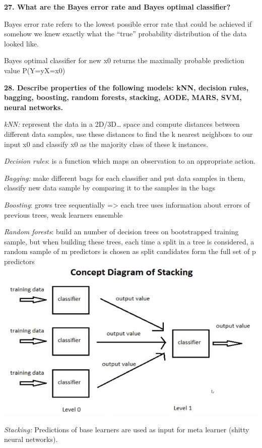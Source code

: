\textbf{27. What are the Bayes error rate and Bayes optimal classifier?}

Bayes error rate refers to the lowest possible error rate that could be
achieved if somehow we knew exactly what the ``true'' probability
distribution of the data looked like.

Bayes optimal classifier for new x0 returns the maximally probable
prediction value P(Y=y\textbar X=x0)

\textbf{28. Describe properties of the following models: kNN, decision
rules, bagging, boosting, random forests, stacking, AODE, MARS, SVM,
neural networks.}

\textit{kNN:} represent the data in a 2D/3D\ldots{} space and compute
distances between different data samples, use these distances to find
the k nearest neighbors to our input x0 and classify x0 as the majority
class of these k instances.

\textit{Decision rules}: is a function which maps an observation to
an appropriate action.

\textit{Bagging:} make different bags for each classifier and put
data samples in them, classify new data sample by comparing it to the
samples in the bags

\textit{Boosting}: grows tree sequentially =\textgreater{} each tree
uses information about errors of previous trees, weak learners ensemble

\textit{Random forests}: build an number of decision trees on
bootstrapped training sample, but when building these trees, each time a
split in a tree is considered, a random sample of m predictors is chosen
as split candidates form the full set of p
predictors
\includegraphics[width=\columnwidth]{media/image35.png}

\textit{Stacking:} Predictions of base learners are used as input for
meta learner (shitty neural networks).

